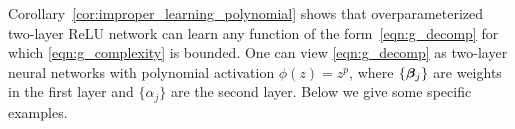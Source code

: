


\vspace{-0.3cm}
Corollary~\ref{cor:improper_learning_polynomial} shows that  overparameterized two-layer ReLU network can learn any function of the form~\eqref{eqn:g_decomp} for which \eqref{eqn:g_complexity} is bounded.
One can view \eqref{eqn:g_decomp} as two-layer neural networks with polynomial activation $\phi(z)=z^p$, where $\{\bm{\beta}_j\}$ are weights in the first layer and $\{\alpha_j\}$ are the second layer.
Below we give some specific examples.

